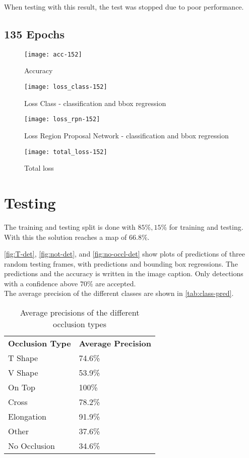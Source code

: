 When testing with this result, the test was stopped due to poor performance.

\subsection{135 Epochs}
\begin{figure}[H]
	\centering
	\texttt{[image: acc-152]}
	\caption{Accuracy}
	\label{fig:}
\end{figure}
\begin{figure}[H]
	\centering
	\texttt{[image: loss\_class-152]}
	\caption{Loss Class - classification and bbox regression}
	\label{fig:}
\end{figure}
\begin{figure}[H]
	\centering
	\texttt{[image: loss\_rpn-152]}
	\caption{Loss Region Proposal Network - classification and bbox regression}
	\label{fig:}
\end{figure}
\begin{figure}[H]
	\centering
	\texttt{[image: total\_loss-152]}
	\caption{Total loss}
	\label{fig:}
\end{figure}


\section{Testing}
The training and testing split is done with $85\%,15\%$ for training and testing. With this the solution reaches a \gls{map} of $66.8\%$.

\autoref{fig:T-det}, \ref{fig:not-det}, and \ref{fig:no-occl-det} show plots of predictions of three random testing frames, with predictions and bounding box regressions. The predictions and the accuracy is written in the image caption. Only detections with a confidence above $70\%$ are accepted.\\

The average precision of the different classes are shown in \autoref{tab:class-pred}.


\begin{table}[H]
	\centering
	\caption{Average precisions of the different occlusion types}
	\label{tab:class-pred}
	\begin{tabular}{ll}
		\textbf{Occlusion Type} & \textbf{Average Precision} \\\rowcolor{lightGrey}\hline
		T Shape                 & 74.6\%                     \\
		V Shape                 & 53.9\%                     \\\rowcolor{lightGrey}
		On Top                  & 100\%                      \\
		Cross                   & 78.2\%                     \\\rowcolor{lightGrey}
		Elongation              & 91.9\%                     \\
		Other                   & 37.6\%                     \\\rowcolor{lightGrey}
		No Occlusion            & 34.6\%                    
	\end{tabular}
\end{table}

